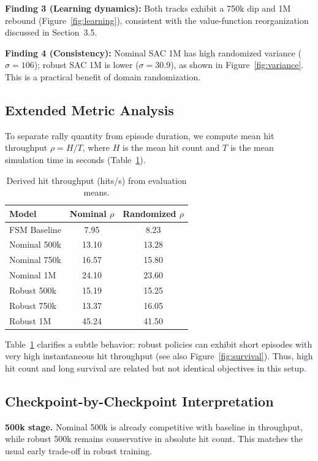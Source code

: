 \documentclass[10pt,twocolumn,letterpaper]{article}
\begin{document}
\textbf{Finding 3 (Learning dynamics):}
Both tracks exhibit a 750k dip and 1M rebound (Figure~\ref{fig:learning}), consistent with the value-function reorganization discussed in Section~3.5.

\textbf{Finding 4 (Consistency):}
Nominal SAC 1M has high randomized variance ($\sigma=106$); robust SAC 1M is lower ($\sigma=30.9$), as shown in Figure~\ref{fig:variance}. This is a practical benefit of domain randomization.

\subsection{Extended Metric Analysis}
To separate rally quantity from episode duration, we compute mean hit throughput
$\rho = H / T$, where $H$ is the mean hit count and $T$ is the mean simulation time in seconds (Table~\ref{tab:throughput}).

\begin{table}[t]
\centering
\caption{Derived hit throughput (hits/s) from evaluation means.}
\label{tab:throughput}
\small
\begin{tabular}{lcc}
\toprule
Model & Nominal $\rho$ & Randomized $\rho$ \\
\midrule
FSM Baseline & 7.95 & 8.23 \\
Nominal 500k & 13.10 & 13.28 \\
Nominal 750k & 16.57 & 15.80 \\
Nominal 1M & 24.10 & 23.60 \\
Robust 500k & 15.19 & 15.25 \\
Robust 750k & 13.37 & 16.05 \\
Robust 1M & 45.24 & 41.50 \\
\bottomrule
\end{tabular}
\end{table}

Table~\ref{tab:throughput} clarifies a subtle behavior: robust policies can exhibit short episodes with very high instantaneous hit throughput (see also Figure~\ref{fig:survival}). Thus, high hit count and long survival are related but not identical objectives in this setup.

\subsection{Checkpoint-by-Checkpoint Interpretation}
\textbf{500k stage.}
Nominal 500k is already competitive with baseline in throughput, while robust 500k remains conservative in absolute hit count. This matches the usual early trade-off in robust training.
\end{document}
